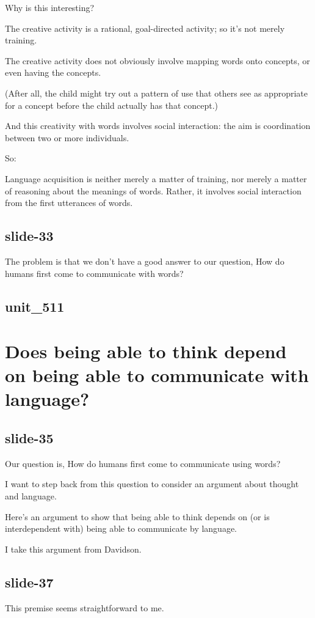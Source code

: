 \documentclass[12pt,\papersize]{extarticle}
\begin{document}
Why is this interesting?
 
The creative activity is a rational, goal-directed activity; so it's not merely training.
 
The creative activity does not obviously involve mapping words onto concepts, or even having the concepts.
 
(After all, the child might try out a pattern of use that others see as appropriate for a concept before the child actually has that concept.)
 
And this creativity with words involves social interaction: the aim is coordination between two or more individuals.
 
So:
 
Language acquisition is neither merely a matter of training, nor merely a matter of reasoning 
about the meanings of words.
Rather, it involves social interaction from the first utterances of words.
 
\subsection{slide-33}
The problem is that we don't have a good answer to our question,
How do humans first come to communicate with words?
 
\subsection{unit\_511}
 
 
\section{Does being able to think depend on being able to communicate with language?}
 
\subsection{slide-35}
Our question is, How do humans first come to communicate using words?
 
I want to step back from this question to consider an argument about thought and language.
 
Here's an argument to show that being able to think depends on (or is interdependent with) being able to communicate by language.
 
I take this argument from Davidson.
 
\subsection{slide-37}
This premise seems straightforward to me.
 
\end{document}

